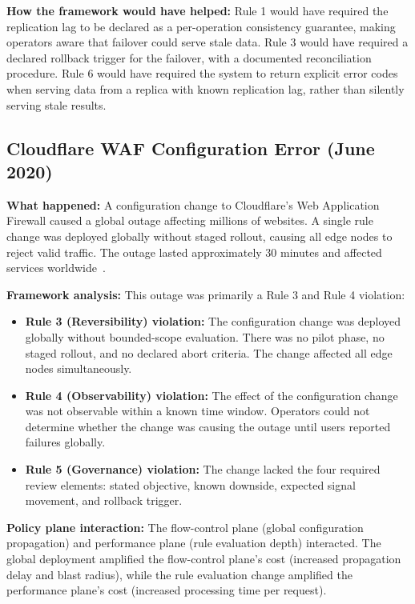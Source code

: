 \documentclass[conference]{IEEEtran}
\begin{document}
\textbf{How the framework would have helped:} Rule 1 would have required the replication lag to be declared as a per-operation consistency guarantee, making operators aware that failover could serve stale data. Rule 3 would have required a declared rollback trigger for the failover, with a documented reconciliation procedure. Rule 6 would have required the system to return explicit error codes when serving data from a replica with known replication lag, rather than silently serving stale results.

\subsection{Cloudflare WAF Configuration Error (June 2020)}

\textbf{What happened:} A configuration change to Cloudflare's Web Application Firewall caused a global outage affecting millions of websites. A single rule change was deployed globally without staged rollout, causing all edge nodes to reject valid traffic. The outage lasted approximately 30 minutes and affected services worldwide~\cite{cloudflare2020}.

\textbf{Framework analysis:} This outage was primarily a Rule 3 and Rule 4 violation:

\begin{itemize}
    \item \textbf{Rule 3 (Reversibility) violation:} The configuration change was deployed globally without bounded-scope evaluation. There was no pilot phase, no staged rollout, and no declared abort criteria. The change affected all edge nodes simultaneously.
    
    \item \textbf{Rule 4 (Observability) violation:} The effect of the configuration change was not observable within a known time window. Operators could not determine whether the change was causing the outage until users reported failures globally.
    
    \item \textbf{Rule 5 (Governance) violation:} The change lacked the four required review elements: stated objective, known downside, expected signal movement, and rollback trigger.
\end{itemize}

\textbf{Policy plane interaction:} The flow-control plane (global configuration propagation) and performance plane (rule evaluation depth) interacted. The global deployment amplified the flow-control plane's cost (increased propagation delay and blast radius), while the rule evaluation change amplified the performance plane's cost (increased processing time per request).
\end{document}
